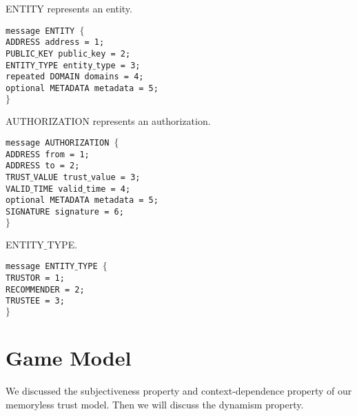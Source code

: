 \documentclass{article}
\begin{document}
ENTITY represents an entity.


\noindent \texttt{message ENTITY $\{$\\
\hspace*{2.ex} ADDRESS address = 1;\\
\hspace*{2.ex} PUBLIC$\_$KEY public$\_$key = 2;\\
\hspace*{2.ex} ENTITY$\_$TYPE entity$\_$type = 3;\\
\hspace*{2.ex} repeated DOMAIN domains = 4;\\
\hspace*{2.ex} optional METADATA metadata = 5;\\
$\}$}

AUTHORIZATION represents an authorization.


\noindent \texttt{message AUTHORIZATION $\{$\\
\hspace*{2.ex} ADDRESS from = 1;\\
\hspace*{2.ex} ADDRESS to = 2;\\
\hspace*{2.ex} TRUST$\_$VALUE trust$\_$value = 3;\\
\hspace*{2.ex} VALID$\_$TIME valid$\_$time = 4;\\
\hspace*{2.ex} optional METADATA metadata = 5;\\
\hspace*{2.ex} SIGNATURE signature = 6;\\
$\}$}

ENTITY$\_$TYPE.


\noindent \texttt{message ENTITY$\_$TYPE $\{$\\
\hspace*{2.ex} TRUSTOR = 1;\\
\hspace*{2.ex} RECOMMENDER = 2;\\
\hspace*{2.ex} TRUSTEE = 3;\\
$\}$}


\section{Game Model}

We discussed the subjectiveness property and context-dependence property of our memoryless trust model. Then we will discuss the dynamism property.
\end{document}
